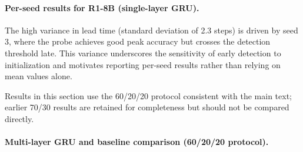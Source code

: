 \paragraph{Per-seed results for R1-8B (single-layer GRU).}

\begin{table}[htbp]
\centering
\small
\caption{R1-8B single-layer GRU results per seed. Lead is measured in steps before the commitment point.}
\label{tab:gru_seeds}
\setlength{\tabcolsep}{4pt}
\end{table}

The high variance in lead time (standard deviation of 2.3 steps) is driven by seed 3, where the probe achieves good peak accuracy but crosses the detection threshold late. This variance underscores the sensitivity of early detection to initialization and motivates reporting per-seed results rather than relying on mean values alone.

Results in this section use the 60/20/20 protocol consistent with the main text; earlier 70/30 results are retained for completeness but should not be compared directly.

\paragraph{Multi-layer GRU and baseline comparison (60/20/20 protocol).}

